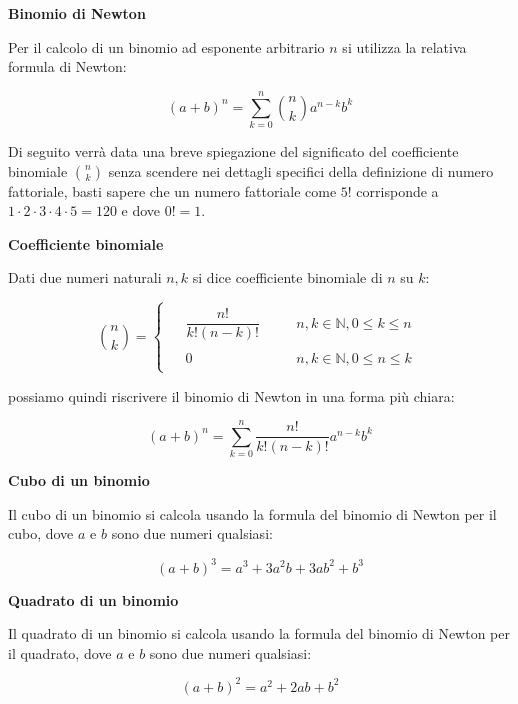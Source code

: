 \documentclass{article}
\begin{document}
\begin{mdframed}
  \vspace{0.2cm}
  \textbf{Binomio di Newton}

  Per il calcolo di un binomio ad esponente arbitrario $n$ si utilizza la relativa formula di Newton:

  \[ (a + b)^n = \sum_{k=0}^{n} \binom{n}{k} a^{n-k}b^k \tag{2.2.2}\label{eq:binomio_di_Newton} \]

  Di seguito verrà data una breve spiegazione del significato del coefficiente binomiale $\binom{n}{k}$ senza scendere nei dettagli specifici della definizione di numero fattoriale, basti sapere che un numero fattoriale come $5!$ corrisponde a $1\cdot2\cdot3\cdot4\cdot5 = 120$ e dove $0! = 1$.

  \vspace{\baselineskip}

  \textbf{Coefficiente binomiale}
  
  Dati due numeri naturali $n, k$ si dice coefficiente binomiale di $n$ su $k$:

  \[ 
    \binom{n}{k} = 
    \begin{cases}
      \begin{aligned}
        &\dfrac{n!}{k!(n-k)!} &&\quad n, k \in \mathbb{N}, 0 \leq k \leq n \\\\
        &0 &&\quad n, k \in \mathbb{N}, 0 \leq n \leq k
      \end{aligned}
    \end{cases}
    \tag{2.2.3}\label{eq:coefficiente_binomiale}
  \]

  possiamo quindi riscrivere il binomio di Newton in una forma più chiara:

  \[ (a + b)^n = \sum_{k=0}^{n} \dfrac{n!}{k!(n-k)!} a^{n-k}b^k \]

  \vspace{\baselineskip}

  \textbf{Cubo di un binomio}

  Il cubo di un binomio si calcola usando la formula del binomio di Newton per il cubo, dove $a$ e $b$ sono due numeri qualsiasi:

  \[ (a + b)^3 = a^3 + 3a^2b + 3ab^2 + b^3 \tag{2.2.4}\label{eq:cubo_di_un_binomio} \]

  \vspace{\baselineskip}

  \textbf{Quadrato di un binomio}

  Il quadrato di un binomio si calcola usando la formula del binomio di Newton per il quadrato, dove $a$ e $b$ sono due numeri qualsiasi:

  \[ (a + b)^2 = a^2 + 2ab + b^2 \tag{2.2.5}\label{eq:quadrato_di_un_binomio} \]
  \vspace{0.2cm}
\end{mdframed}
\end{document}
